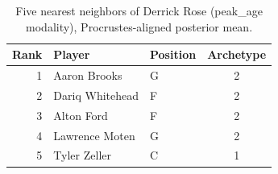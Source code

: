 \begin{table}[htbp]
  \centering\small
  \begin{tabular}{rllc}
    \toprule
    Rank & Player & Position & Archetype \\
    \midrule
    1 & Aaron Brooks & G & 2 \\
    2 & Dariq Whitehead & F & 2 \\
    3 & Alton Ford & F & 2 \\
    4 & Lawrence Moten & G & 2 \\
    5 & Tyler Zeller & C & 1 \\
    \bottomrule
  \end{tabular}
  \caption{Five nearest neighbors of Derrick Rose (peak_age modality), Procrustes-aligned posterior mean.}
  \label{tab:Derrick_Rose_neighbors_peak_age}
\end{table}

